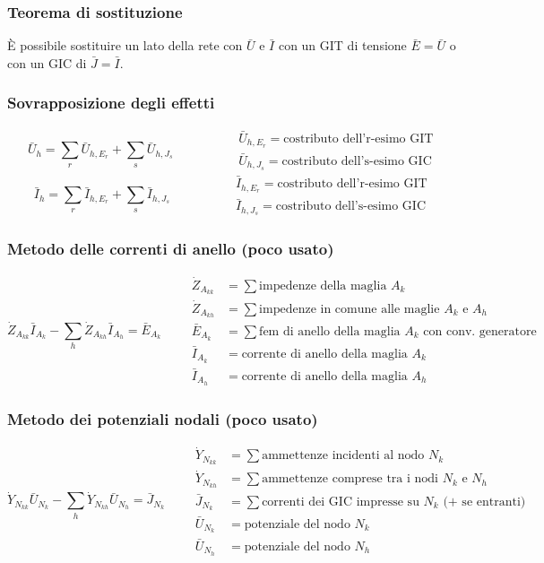 \documentclass[a4paper]{article}
\begin{document}
\subsubsection*{Teorema di sostituzione}
È possibile sostituire un lato della rete con \(\bar{U}\) e \(\bar{I}\) con un GIT di tensione \(\bar{E} = \bar{U}\)
o con un GIC di \(\bar{J} = \bar{I}\).

\subsubsection*{Sovrapposizione degli effetti}
\[\bar{U}_h = \sum_r \bar{U}_{h,E_r} + \sum_s \bar{U}_{h,J_s} \qquad \qquad \begin{aligned} &\bar{U}_{h,E_r} = \text{costributo dell'r-esimo GIT} \\ &\bar{U}_{h,J_s} = \text{costributo dell's-esimo GIC}\end{aligned}\]
\[\bar{I}_h = \sum_r \bar{I}_{h,E_r} + \sum_s \bar{I}_{h,J_s} \qquad \qquad \begin{aligned} &\bar{I}_{h,E_r} = \text{costributo dell'r-esimo GIT} \\ &\bar{I}_{h,J_s} = \text{costributo dell's-esimo GIC}\end{aligned}\]

\subsubsection*{Metodo delle correnti di anello (poco usato)}
\[\dot{Z}_{A_{kk}} \bar{I}_{A_k} - \sum_h \dot{Z}_{A_{kh}} \bar{I}_{A_h} = \bar{E}_{A_k} \qquad
\begin{aligned}
	\dot{Z}_{A_{kk}} &= \sum \text{impedenze della maglia } A_k \\
	\dot{Z}_{A_{kh}} &= \sum \text{impedenze in comune alle maglie } A_k \text{ e } A_h \\
	\bar{E}_{A_k} &= \sum \text{fem di anello della maglia } A_k \text{ con conv. generatore} \\
	\bar{I}_{A_k} &= \text{corrente di anello della maglia } A_k \\
	\bar{I}_{A_h} &= \text{corrente di anello della maglia } A_h
\end{aligned}\]

\subsubsection*{Metodo dei potenziali nodali (poco usato)}
\[\dot{Y}_{N_{kk}} \bar{U}_{N_k} - \sum_{h} \dot{Y}_{N_{kh}} \bar{U}_{N_h} = \bar{J}_{N_k} \qquad
\begin{aligned}
	\dot{Y}_{N_{kk}} &= \sum \text{ammettenze incidenti al nodo } N_k \\
	\dot{Y}_{N_{kh}} &= \sum \text{ammettenze comprese tra i nodi } N_k \text{ e } N_h \\
	\bar{J}_{N_k} &= \sum \text{correnti dei GIC impresse su } N_k \text{ (+ se entranti)} \\
	\bar{U}_{N_k} &= \text{potenziale del nodo } N_k \\
	\bar{U}_{N_h} &= \text{potenziale del nodo } N_h
\end{aligned}\]
\end{document}
